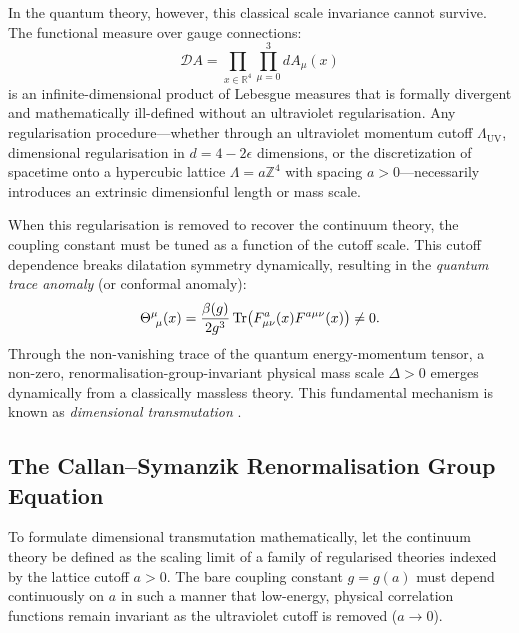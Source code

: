 In the quantum theory, however, this classical scale invariance cannot survive. The functional measure over gauge connections:
\begin{equation}
\mathcal{D}A = \prod_{x \in \mathbb{R}^4} \prod_{\mu=0}^3 dA_\mu(x)
\end{equation}
is an infinite-dimensional product of Lebesgue measures that is formally divergent and mathematically ill-defined without an ultraviolet regularisation. Any regularisation procedure—whether through an ultraviolet momentum cutoff $\Lambda_{\mathrm{UV}}$, dimensional regularisation in $d = 4 - 2\epsilon$ dimensions, or the discretization of spacetime onto a hypercubic lattice $\Lambda = a \mathbb{Z}^4$ with spacing $a > 0$—necessarily introduces an extrinsic dimensionful length or mass scale.

When this regularisation is removed to recover the continuum theory, the coupling constant must be tuned as a function of the cutoff scale. This cutoff dependence breaks dilatation symmetry dynamically, resulting in the \emph{quantum trace anomaly} (or conformal anomaly):
\begin{equation}
\label{eq:trace_anomaly}
\Theta^\mu_{\ \mu}(x) = \frac{\beta(g)}{2g^3} \, \mathrm{Tr}\bigl( F_{\mu\nu}^a(x) F^{a\mu\nu}(x) \bigr) \neq 0.
\end{equation}
Through the non-vanishing trace of the quantum energy-momentum tensor, a non-zero, renormalisation-group-invariant physical mass scale $\Delta > 0$ emerges dynamically from a classically massless theory. This fundamental mechanism is known as \emph{dimensional transmutation} \cite{ColemanWeinberg1973}.

\subsection{The Callan--Symanzik Renormalisation Group Equation}
\label{subsec:callan_symanzik}

To formulate dimensional transmutation mathematically, let the continuum theory be defined as the scaling limit of a family of regularised theories indexed by the lattice cutoff $a > 0$. The bare coupling constant $g = g(a)$ must depend continuously on $a$ in such a manner that low-energy, physical correlation functions remain invariant as the ultraviolet cutoff is removed ($a \to 0$).

